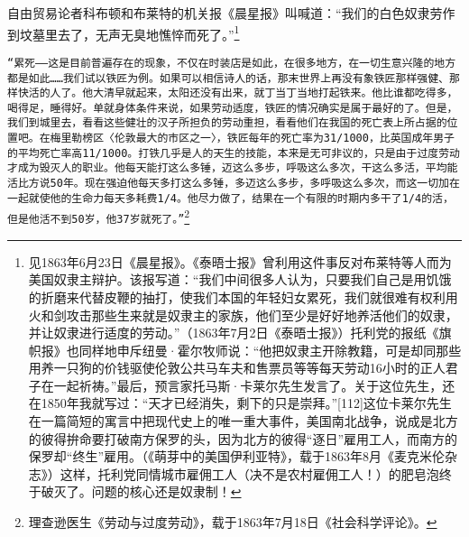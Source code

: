 \documentclass{ctexbook}
\begin{document}
    自由贸易论者科布顿和布莱特的机关报《晨星报》叫喊道：“我们的白色奴隶劳作到坟墓里去了，无声无臭地憔悴而死了。”\footnote{见1863年6月23日《晨星报》。《泰晤士报》曾利用这件事反对布莱特等人而为美国奴隶主辩护。该报写道：“我们中间很多人认为，只要我们自己是用饥饿的折磨来代替皮鞭的抽打，使我们本国的年轻妇女累死，我们就很难有权利用火和剑攻击那些生来就是奴隶主的家族，他们至少是好好地养活他们的奴隶，并让奴隶进行适度的劳动。”（1863年7月2日《泰晤士报》）托利党的报纸《旗帜报》也同样地申斥纽曼·霍尔牧师说：“他把奴隶主开除教籍，可是却同那些用养一只狗的价钱驱使伦敦公共马车夫和售票员等等每天劳动16小时的正人君子在一起祈祷。”最后，预言家托马斯·卡莱尔先生发言了。关于这位先生，还在1850年我就写过：“天才已经消失，剩下的只是崇拜。”[112]这位卡莱尔先生在一篇简短的寓言中把现代史上的唯一重大事件，美国南北战争，说成是北方的彼得拚命要打破南方保罗的头，因为北方的彼得“逐日”雇用工人，而南方的保罗却“终生”雇用。（《萌芽中的美国伊利亚特》，载于1863年8月《麦克米伦杂志》）这样，托利党同情城市雇佣工人（决不是农村雇佣工人！）的肥皂泡终于破灭了。问题的核心还是奴隶制！}

    \texttt{“累死——这是目前普遍存在的现象，不仅在时装店是如此，在很多地方，在一切生意兴隆的地方都是如此……我们试以铁匠为例。如果可以相信诗人的话，那末世界上再没有象铁匠那样强健、那样快活的人了。他大清早就起来，太阳还没有出来，就丁当丁当地打起铁来。他比谁都吃得多，喝得足，睡得好。单就身体条件来说，如果劳动适度，铁匠的情况确实是属于最好的了。但是，我们到城里去，看看这些健壮的汉子所担负的劳动重担，看看他们在我国的死亡表上所占据的位置吧。在梅里勒榜区〈伦敦最大的市区之一〉，铁匠每年的死亡率为31/1000，比英国成年男子的平均死亡率高11/1000。打铁几乎是人的天生的技能，本来是无可非议的，只是由于过度劳动才成为毁灭人的职业。他每天能打这么多锤，迈这么多步，呼吸这么多次，干这么多活，平均能活比方说50年。现在强迫他每天多打这么多锤，多迈这么多步，多呼吸这么多次，而这一切加在一起就使他的生命力每天多耗费1/4。他尽力做了，结果在一个有限的时期内多干了1/4的活，但是他活不到50岁，他37岁就死了。”}\footnote{理查逊医生《劳动与过度劳动》，载于1863年7月18日《社会科学评论》。}
\end{document}
